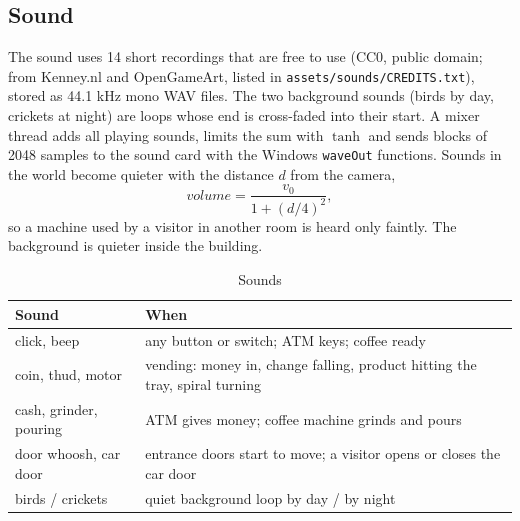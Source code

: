 \subsection{Sound}\label{sec:sound}
The sound uses 14 short recordings that are free to use (CC0, public domain; from Kenney.nl and OpenGameArt, listed
in \texttt{assets/sounds/CREDITS.txt}), stored as 44.1 kHz mono WAV files. The two background sounds (birds by day,
crickets at night) are loops whose end is cross-faded into their start. A mixer thread adds all playing sounds,
limits the sum with $\tanh$ and sends blocks of 2048 samples to the sound card with the Windows \texttt{waveOut}
functions. Sounds in the world become quieter with the distance $d$ from the camera,
\[
volume = \frac{v_0}{1+(d/4)^2},
\]
so a machine used by a visitor in another room is heard only faintly. The background is quieter inside the building.
\begin{table}[H]
\centering\small
\caption{Sounds}\label{tab:sounds}
\begin{tabularx}{\linewidth}{@{}P{3.0cm}X@{}}
\toprule
Sound & When \\ \midrule
click, beep & any button or switch; ATM keys; coffee ready \\
coin, thud, motor & vending: money in, change falling, product hitting the tray, spiral turning \\
cash, grinder, pouring & ATM gives money; coffee machine grinds and pours \\
door whoosh, car door & entrance doors start to move; a visitor opens or closes the car door \\
birds / crickets & quiet background loop by day / by night \\
\bottomrule
\end{tabularx}
\end{table}

